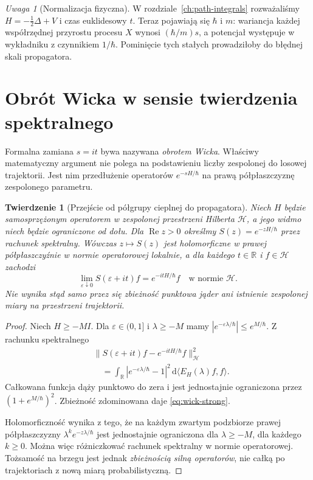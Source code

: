 \documentclass[11pt,a4paper,oneside]{report}
\numberwithin{equation}{chapter}
\theoremstyle{plain}
\newtheorem{twierdzenie}{Twierdzenie}[chapter]
\theoremstyle{definition}
\theoremstyle{remark}
\newtheorem{uwaga}{Uwaga}[chapter]
\newcommand{\R}{\mathbb{R}}
\newcommand{\calH}{\mathcal{H}}
\newcommand{\dd}{\mathrm{d}}
\begin{document}
\begin{uwaga}[Normalizacja fizyczna]
W rozdziale~\ref{ch:path-integrals} rozważaliśmy
$H=-\frac12\Delta+V$ i czas euklidesowy $t$.
Teraz pojawiają się $\hbar$ i $m$: wariancja każdej
współrzędnej przyrostu procesu $X$ wynosi
$(\hbar/m)s$, a potencjał występuje w wykładniku
z czynnikiem $1/\hbar$. Pominięcie tych stałych
prowadziłoby do błędnej skali propagatora.
\end{uwaga}

\section{Obrót Wicka w sensie twierdzenia spektralnego}

Formalna zamiana $s=it$ bywa nazywana \emph{obrotem Wicka}.
Właściwy matematyczny argument nie polega na
podstawieniu liczby zespolonej do losowej trajektorii.
Jest nim przedłużenie operatorów
$e^{-sH/\hbar}$ na prawą półpłaszczyznę
zespolonego parametru.

\begin{twierdzenie}[Przejście od półgrupy cieplnej do propagatora]
\label{th:wick-spectral}
Niech $H$ będzie samosprzężonym operatorem w zespolonej
przestrzeni Hilberta $\calH$, a jego widmo niech będzie
ograniczone od dołu. Dla $\operatorname{Re}z>0$ określmy
$S(z)=e^{-zH/\hbar}$ przez rachunek spektralny.
Wówczas $z\mapsto S(z)$ jest holomorficzne w prawej
półpłaszczyźnie w normie operatorowej lokalnie, a dla
każdego $t\in\R$ i $f\in\calH$ zachodzi
\[
 \lim_{\varepsilon\downarrow0}
  S(\varepsilon+it)f=e^{-itH/\hbar}f
  \quad\text{w normie }\calH.
\tag{16.5}\label{eq:wick-strong}
\]
Nie wynika stąd samo przez się zbieżność punktowa jąder
ani istnienie zespolonej miary na przestrzeni trajektorii.
\end{twierdzenie}
\begin{proof}
Niech $H\ge-MI$. Dla $\varepsilon\in(0,1]$ i
$\lambda\ge-M$ mamy $|e^{-\varepsilon\lambda/\hbar}|
\le e^{M/\hbar}$. Z rachunku spektralnego
\[
\begin{split}
&\|S(\varepsilon+it)f-e^{-itH/\hbar}f\|_{\calH}^2\\
&\quad=\int_{\R}\left|e^{-\varepsilon\lambda/\hbar}-1\right|^2
 \,\dd\langle E_H(\lambda)f,f\rangle.
\end{split}
\]
Całkowana funkcja dąży punktowo do zera i jest
jednostajnie ograniczona przez $(1+e^{M/\hbar})^2$.
Zbieżność zdominowana daje \eqref{eq:wick-strong}.

Holomorficzność wynika z tego, że na każdym zwartym
podzbiorze prawej półpłaszczyzny
$\lambda^k e^{-z\lambda/\hbar}$ jest jednostajnie
ograniczona dla $\lambda\ge-M$, dla każdego $k\ge0$.
Można więc różniczkować rachunek spektralny w normie
operatorowej. Tożsamość na brzegu jest jednak
\emph{zbieżnością silną operatorów}, nie całką po
trajektoriach z nową miarą probabilistyczną.
\end{proof}
\end{document}
